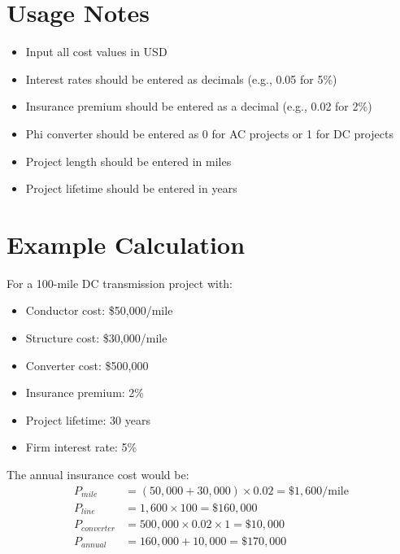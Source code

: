 \documentclass[12pt]{article}
\begin{document}
\section{Usage Notes}

\begin{itemize}
    \item Input all cost values in USD
    \item Interest rates should be entered as decimals (e.g., 0.05 for 5\%)
    \item Insurance premium should be entered as a decimal (e.g., 0.02 for 2\%)
    \item Phi converter should be entered as 0 for AC projects or 1 for DC projects
    \item Project length should be entered in miles
    \item Project lifetime should be entered in years
\end{itemize}

\section{Example Calculation}

For a 100-mile DC transmission project with:
\begin{itemize}
    \item Conductor cost: \$50,000/mile
    \item Structure cost: \$30,000/mile
    \item Converter cost: \$500,000
    \item Insurance premium: 2\%
    \item Project lifetime: 30 years
    \item Firm interest rate: 5\%
\end{itemize}

The annual insurance cost would be:
\begin{align}
P_{mile} &= (50,000 + 30,000) \times 0.02 = \$1,600/\text{mile} \\
P_{line} &= 1,600 \times 100 = \$160,000 \\
P_{converter} &= 500,000 \times 0.02 \times 1 = \$10,000 \\
P_{annual} &= 160,000 + 10,000 = \$170,000
\end{align}
\end{document}
